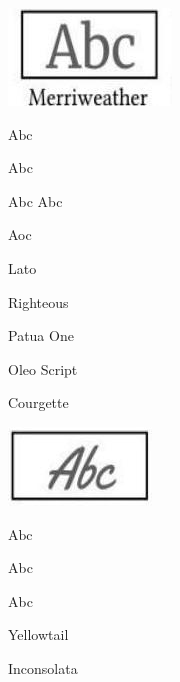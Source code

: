 \documentclass[10pt]{article}
\begin{document}
\begin{center}
\includegraphics[max width=\textwidth]{2023_01_16_edd5388a973e00ef26e3g-2(2)}
\end{center}

$\mathrm{Abc}$

Abc

Abc Abc

Aoc

Lato

Righteous

Patua One

Oleo Script

Courgette

\begin{center}
\includegraphics[max width=\textwidth]{2023_01_16_edd5388a973e00ef26e3g-2(3)}
\end{center}

$\mathrm{Abc}$

Abc

Abc

Yellowtail

Inconsolata
\end{document}
